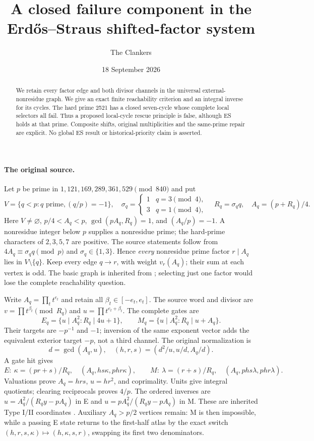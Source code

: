 \documentclass[10pt,a4paper]{article}
\title{A closed failure component in the\protect\\Erd\H{o}s--Straus shifted-factor system}
\author{The Clankers}
\date{18 September 2026}
\begin{document}
\maketitle
\begin{abstract}
We retain every factor edge and both divisor channels in the universal
external-nonresidue graph. We give an exact finite reachability criterion and
an integral inverse for its cycles. The hard prime 2521 has a closed seven-cycle
whose complete local selectors all fail. Thus a proposed local-cycle rescue
principle is false, although ES holds at that prime. Composite shifts, original
multiplicities and the same-prime repair are explicit. No global ES result or
historical-priority claim is asserted.
\end{abstract}

\paragraph{The original source.}
Let $p$ be prime in $1,121,169,289,361,529\pmod{840}$ and put
\[
 V=\{q<p:q\text{ prime},(q/p)=-1\},\quad
 \sigma_q=\begin{cases}1&q=3\pmod4,\\3&q=1\pmod4,\end{cases}
 \quad R_q=\sigma_q q,\quad A_q=(p+R_q)/4.
\]
Here $V\ne\varnothing$, $p/4<A_q<p$, $\gcd(pA_q,R_q)=1$, and
$(A_q/p)=-1$. A nonresidue integer below $p$ supplies a nonresidue prime;
the hard-prime characters of $2,3,5,7$ are positive. The source statements
follow from $4A_q\equiv\sigma_q q\pmod p$ and $\sigma_q\in\{1,3\}$.
Hence \emph{every} nonresidue prime factor $r\mid A_q$ lies in $V\setminus\{q\}$.
Keep every edge $q\to r$, with weight $v_r(A_q)$; their sum at each vertex is odd.
The basic graph is inherited from \cite[\S\S1--7]{Graph}; selecting just one
factor would lose the complete reachability question.

Write $A_q=\prod_t t^{e_t}$ and retain all $\beta_t\in[-e_t,e_t]$.
The source word and divisor are
$v=\prod t^{\beta_t}\pmod{R_q}$ and $u=\prod t^{e_t+\beta_t}$.
The complete gates are
\[
 E_q=\{u\mid A_q^2:R_q\mid4u+1\},\qquad
 M_q=\{u\mid A_q^2:R_q\mid u+A_q\}.
\]
Their targets are $-p^{-1}$ and $-1$; inversion of the same exponent vector
adds the equivalent exterior target $-p$, not a third channel.
The original normalization is
\[
 d=\gcd(A_q,u),\quad(h,r,s)=(d^2/u,u/d,A_q/d).
\]
A gate hit gives
\[
 E:\ \kappa=(pr+s)/R_q,\quad(A_q,hs\kappa,phr\kappa),
 \qquad
 M:\ \lambda=(r+s)/R_q,\quad(A_q,phs\lambda,phr\lambda).
 \tag{1}
\]
Valuations prove $A_q=hrs$, $u=hr^2$, and coprimality. Units give integral
quotients; clearing reciprocals proves $4/p$. The ordered inverses are
$u=A_q^2/(R_qy-pA_q)$ in E and $u=pA_q^2/(R_qy-pA_q)$ in M.
These are inherited Type I/II coordinates \cite[\S2]{ET}.
Auxiliary $A_q>p/2$ vertices remain: M is then impossible, while a passing E
state returns to the first-half atlas by the exact switch
$(h,r,s,\kappa)\mapsto(h,\kappa,s,r)$, swapping its first two denominators.
\end{document}
